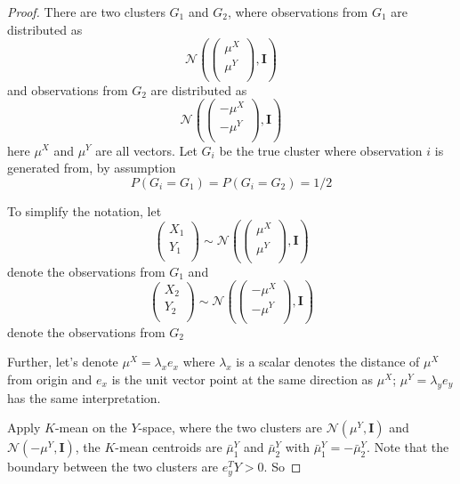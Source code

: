 \documentclass[11pt]{article}
\begin{document}
\begin{proof}
There are two clusters $G_1$ and $G_2$, where observations from $G_1$ are distributed as
\[	\mathcal{N}\left( \begin{pmatrix} 
    \mu^X \\
    \mu^Y \\
  \end{pmatrix}, \mathbf{I} \right)	\]
and observations from $G_2$ are distributed as
\[	\mathcal{N}\left( \begin{pmatrix} 
    -\mu^X \\
    -\mu^Y \\
  \end{pmatrix}, \mathbf{I} \right)	\]
here $\mu^X$ and $\mu^Y$ are all vectors. Let $G_i$ be the true cluster where observation $i$ is generated from, by assumption
\[	P(G_i=G_1) = P(G_i=G_2) = 1/2	\]

To simplify the notation, let 
\[
 \begin{pmatrix} 
    X_1 \\
    Y_1 \\
  \end{pmatrix}  \sim
  \mathcal{N}\left( \begin{pmatrix} 
    \mu^X \\
    \mu^Y \\
  \end{pmatrix}, \mathbf{I} \right)
\]  
denote the observations from $G_1$ and 
\[
 \begin{pmatrix} 
    X_2 \\
    Y_2 \\
  \end{pmatrix}  \sim
  \mathcal{N}\left( \begin{pmatrix} 
    -\mu^X \\
    -\mu^Y \\
  \end{pmatrix}, \mathbf{I} \right)
\]  
denote the observations from $G_2$ 

Further, let's denote $\mu^X = \lambda_x e_x$ where $\lambda_x$ is a scalar denotes the distance of $\mu^X$ from origin and $e_x$ is the unit vector point at the same direction as $\mu^X$; $\mu^Y = \lambda_y e_y$ has the same interpretation.

Apply $K$-mean on the $Y$-space, where the two clusters are $\mathcal{N}\left( \mu^Y, \mathbf{I}\right)$ and  $\mathcal{N}\left( -\mu^Y, \mathbf{I}\right)$, the $K$-mean centroids are $\bar{\mu}^Y_1$ and $\bar{\mu}^Y_2$ with $\bar{\mu}^Y_1 = -\bar{\mu}^Y_2$. Note that the boundary between the two clusters are $e^T_y Y > 0 $. So 


\end{proof}
\end{document}
